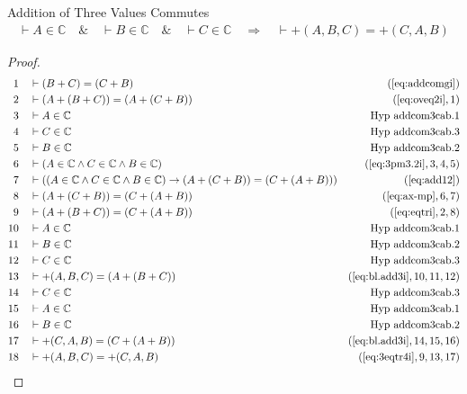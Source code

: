 \begin{lemma} Addition of Three Values Commutes
\begin{align}
\vdash A \in \mathbb{C}\quad\&\quad \vdash B \in \mathbb{C}\quad\&\quad \vdash
    C \in \mathbb{C}\quad\Rightarrow\quad \vdash +( A , B , C ) = +( C , A , B
    )\label{eq:bl.addcom3cab}\tag{bl.addcom3cab}
\end{align}
\end{lemma}

\begin{proof}
\begin{align}
  1 &&  & \vdash ( B + C ) = ( C + B )&(\mbox{\ref{eq:addcomgi}})\notag
  \\ 2 &&  & \vdash ( A + ( B + C ) ) = ( A + ( C + B ) )&(\mbox{\ref{eq:oveq2i}},1)\notag
  \\ 3 &&  & \vdash A \in
\mathbb{C}&\text{Hyp~addcom3cab.1}\notag%
  \\ 4 &&  & \vdash C \in
\mathbb{C}&\text{Hyp~addcom3cab.3}\notag%
  \\ 5 &&  & \vdash B \in
\mathbb{C}&\text{Hyp~addcom3cab.2}\notag%
  \\ 6 &&  & \vdash ( A \in \mathbb{C} \wedge C \in \mathbb{C} \wedge B \in \mathbb{C} )&(\mbox{\ref{eq:3pm3.2i}},3,4,5)\notag
  \\ 7 &&  & \vdash ( ( A \in \mathbb{C} \wedge C \in \mathbb{C} \wedge B \in \mathbb{C} ) \rightarrow ( A + ( C + B ) ) = ( C + ( A + B ) ) )&(\mbox{\ref{eq:add12}})\notag
  \\ 8 &&  & \vdash ( A + ( C + B ) ) = ( C + ( A + B ) )&(\mbox{\ref{eq:ax-mp}},6,7)\notag
  \\ 9 &&  & \vdash ( A + ( B + C ) ) = ( C + ( A + B ) )&(\mbox{\ref{eq:eqtri}},2,8)\notag
  \\ 10 &&  & \vdash A \in
\mathbb{C}&\text{Hyp~addcom3cab.1}\notag%
  \\ 11 &&  & \vdash B \in
\mathbb{C}&\text{Hyp~addcom3cab.2}\notag%
  \\ 12 &&  & \vdash C \in
\mathbb{C}&\text{Hyp~addcom3cab.3}\notag%
  \\ 13 &&  & \vdash +( A , B , C ) = ( A + ( B + C ) )&(\mbox{\ref{eq:bl.add3i}},10,11,12)\notag
  \\ 14 &&  & \vdash C \in
\mathbb{C}&\text{Hyp~addcom3cab.3}\notag%
  \\ 15 &&  & \vdash A \in
\mathbb{C}&\text{Hyp~addcom3cab.1}\notag%
  \\ 16 &&  & \vdash B \in
\mathbb{C}&\text{Hyp~addcom3cab.2}\notag%
  \\ 17 &&  & \vdash +( C , A , B ) = ( C + ( A + B ) )&(\mbox{\ref{eq:bl.add3i}},14,15,16)\notag
  \\ 18 &&  & \vdash +( A , B , C ) = +( C , A , B )&(\mbox{\ref{eq:3eqtr4i}},9,13,17)\notag
\end{align}
\end{proof}

